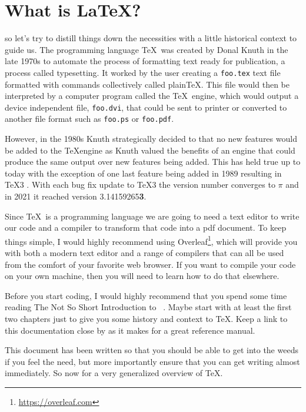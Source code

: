 \section{What is \LaTeX?}


so let's try to distill things down the necessities with a 
little historical context to guide us.  The 
programming language \TeX\ was created by Donal Knuth in the late
1970s to automate the process of formatting text ready for publication, 
a process called typesetting.  It worked by the user creating a \texttt{foo.tex} 
text file formatted with commands collectively called plain\TeX. This file would 
then be interpreted by a computer program called the \TeX\ engine, which would 
output a device independent file, \texttt{foo.dvi}, that could be sent to printer or 
converted to another file format such as \texttt{foo.ps} or \texttt{foo.pdf}.

However, in the 1980s Knuth strategically decided to that no new features would
be added to the \TeX engine as Knuth valued the benefits of an engine that
could produce the same output over new features being added. This has held true
up to today with the exception of one last feature being added in 1989 resulting
in \TeX3 \cite{GuideManyFlavours}.  With each bug fix update to \TeX3 the version number 
converges to \( \pi \) and in 2021 it reached version 3.14159265\textbf{3}\cite{CTANPackageLshort}.

Since \TeX\ is a programming language we are going to need a text editor
to write our code and a compiler to transform that code into a pdf document.
To keep things simple, I would highly recommend using  
Overleaf\footnote{\url{https://overleaf.com}}, which will provide you with  
both a modern text editor and a range of compilers that can all be used from
the comfort of your favorite web browser.  If you want to compile your code
on your own machine, then you will need to learn how to do that elsewhere.

Before you start coding, I would highly recommend that you spend some time
reading The Not So Short Introduction to \LaTeXe\ \cite{CTANPackageLshort}. 
Maybe start with at least the first two chapters just to give you some history
and context to \TeX.  Keep a link to this documentation close by as it 
makes for a great reference manual.

This document has been written so that you should be able to get into the 
weeds if you feel the need, but more importantly ensure that you can get 
writing almost immediately.  So now for a very generalized overview of \TeX.


